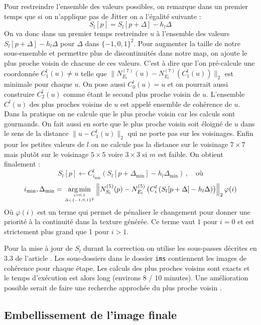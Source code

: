 \documentclass[12pt]{article}
\DeclareMathOperator*{\argmin}{arg\,min}
\begin{document}
Pour restreindre l'ensemble des valeurs possibles, on remarque dans un premier temps que si on n'applique pas de Jitter on a l'égalité suivante :
$$ S_l[p] = S_l \left[ p + \Delta \right] - h_l \Delta $$
On va donc dans un premier temps restreindre $u$ à l'ensemble des valeurs $S_l \left[ p + \Delta \right] - h_l \Delta$ pour $\Delta$ dans $\{ -1, 0, 1 \}^2$. Pour augmenter la taille de notre sous-ensemble et permettre plus de discontinuités dans notre map, on ajoute le plus proche voisin de chacune de ces valeurs. C'est à dire que l'on pré-calcule une coordonnée $C_1^l(u) \neq u$ telle que $ \| N_{E_l}^{(7)}(u) - N_{E_l}^{(7)}(C_1^l(u)) \|_2 $ est minimale pour chaque $u$. On pose aussi $C_0^l(u) = u$ et on pourrait aussi construire $C_
2^l(u)$ comme étant le second plus proche voisin de $u$. L'ensemble $C^l(u)$ des plus proches voisins de $u$ est appelé ensemble de cohérence de $u$. Dans la pratique on ne calcule que le plus proche voisin car les calculs sont gourmands. On fait aussi en sorte que le plus proche voisin soit éloigné de $u$ dans le sens de la distance $\| u - C_1^l(u) \|_2$ qui ne porte pas sur les voisinages. Enfin pour les petites valeurs de $l$ on ne calcule pas la distance sur le voisinage $7 \times 7$ mais plutôt sur le voisinage $5 \times 5$ voire $3 \times 3$ si $m$ est faible. On obtient finalement :
$$ S_l[p] \gets C_{i_{\min}}^l \left( S_l \left[ p + \Delta_{\min} \right] - h_l \Delta_{\min} \right) \, , \quad \text{où} $$
$$ i_{\min}, \Delta_{\min} = \argmin_{i = 0, 1 \atop \Delta \in \{ -1, 0, 1 \}^2} \left\| N_{S_l}^{(5)}(p) - N_{E_l}^{(5)} \left( C_i^l \left( S_l[p + \Delta] - h_l \Delta \right) \right) \right\|_2 \varphi(i) $$
Où $\varphi(i)$ est un terme qui permet de pénaliser le changement pour donner une priorité à la continuité dans la texture générée. Ce terme vaut $1$ pour $i = 0$ et est strictement plus grand que 1 pour $i > 1$.

Pour la mise à jour de $S_l$ durant la correction on utilise les sous-passes décrites en 3.3 de l'article \cite{Lef++}. Les sous-dossiers dans le dossier \verb|ims| contiennent les images de cohérence pour chaque étape. Les calculs des plus proches voisins sont exacts et le temps d'exécution est alors long (environs 8 / 10 minutes). Une amélioration possible serait de faire une recherche approchée du plus proche voisin \cite{Ary++}.

\subsection{Embellissement de l'image finale}
\end{document}
